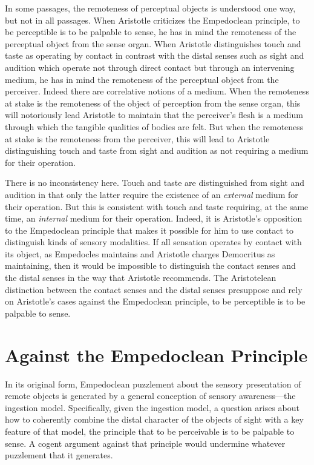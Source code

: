 In some passages, the remoteness of perceptual objects is understood one way, but not in all passages. When Aristotle criticizes the Empedoclean principle, to be perceptible is to be palpable to sense, he has in mind the remoteness of the perceptual object from the sense organ. When Aristotle distinguishes touch and taste as operating by contact in contrast with the distal senses such as sight and audition which operate not through direct contact but through an intervening medium, he has in mind the remoteness of the perceptual object from the perceiver. Indeed there are correlative notions of a medium. When the remoteness at stake is the remoteness of the object of perception from the sense organ, this will notoriously lead Aristotle to maintain that the perceiver's flesh is a medium through which the tangible qualities of bodies are felt. But when the remoteness at stake is the remoteness from the perceiver, this will lead to Aristotle distinguishing touch and taste from sight and audition as not requiring a medium for their operation. 

There is no inconsistency here. Touch and taste are distinguished from sight and audition in that only the latter require the existence of an \emph{external} medium for their operation. But this is consistent with touch and taste requiring, at the same time, an \emph{internal} medium for their operation. Indeed, it is Aristotle's opposition to the Empedoclean principle that makes it possible for him to use contact to distinguish kinds of sensory modalities. If all sensation operates by contact with its object, as Empedocles maintains and Aristotle charges Democritus as maintaining, then it would be impossible to distinguish the contact senses and the distal senses in the way that Aristotle recommends. The Aristotelean distinction between the contact senses and the distal senses presuppose and rely on Aristotle's cases against the Empedoclean principle, to be perceptible is to be palpable to sense.



\section{Against the Empedoclean Principle} %
\label{sec:against_the_empedoclean_principle}

In its original form, Empedoclean puzzlement about the sensory presentation of remote objects is generated by a general conception of sensory awareness---the ingestion model. Specifically, given the ingestion model, a question arises about how to coherently combine the distal character of the objects of sight with a key feature of that model, the principle that to be perceivable is to be palpable to sense. A cogent argument against that principle would undermine whatever puzzlement that it generates. 

